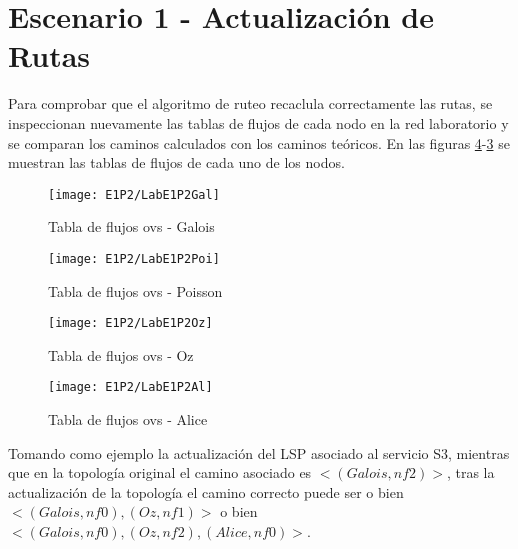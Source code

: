 
\section{Escenario 1 - Actualización de Rutas}
\label{appendix6.3}

Para comprobar que el algoritmo de ruteo recaclula correctamente las rutas, se inspeccionan nuevamente las tablas de flujos de cada nodo en la red laboratorio y se comparan los caminos calculados con los caminos te\'oricos. En las figuras \ref{fig:CU1P2DumpFlows1}-\ref{fig:CU1P2DumpFlows4} se muestran las tablas de flujos de cada uno de los nodos.\\

\newpage
\begin{figure}[ht!] 
\centering    
\texttt{[image: E1P2/LabE1P2Gal]}
\caption[Tabla de flujos ovs - Galois]{Tabla de flujos ovs - Galois}
\label{fig:CU1P2DumpFlows2}
\end{figure}

\begin{figure}[h] 
\centering    
\texttt{[image: E1P2/LabE1P2Poi]}
\caption[Tabla de flujos ovs - Poisson]{Tabla de flujos ovs - Poisson}
\label{fig:CU1P2DumpFlows3}
\end{figure}

\newpage
\begin{figure}[h] 
\centering    
\texttt{[image: E1P2/LabE1P2Oz]}
\caption[Tabla de flujos ovs - Oz]{Tabla de flujos ovs - Oz}
\label{fig:CU1P2DumpFlows4}
\end{figure}

\begin{figure}[h] 
\centering    
\texttt{[image: E1P2/LabE1P2Al]}
\caption[Tabla de flujos ovs - Alice]{Tabla de flujos ovs - Alice}
\label{fig:CU1P2DumpFlows1}
\end{figure}

Tomando como ejemplo la actualizaci\'on del LSP asociado al servicio S3, mientras que en la topolog\'ia original el camino asociado es $<(Galois, nf2)>$, tras la actualizaci\'on de la topolog\'ia el camino correcto puede ser o bien $<(Galois, nf0),(Oz, nf1)>$ o bien \\ $<(Galois, nf0), (Oz, nf2), (Alice, nf0)>$.\\

